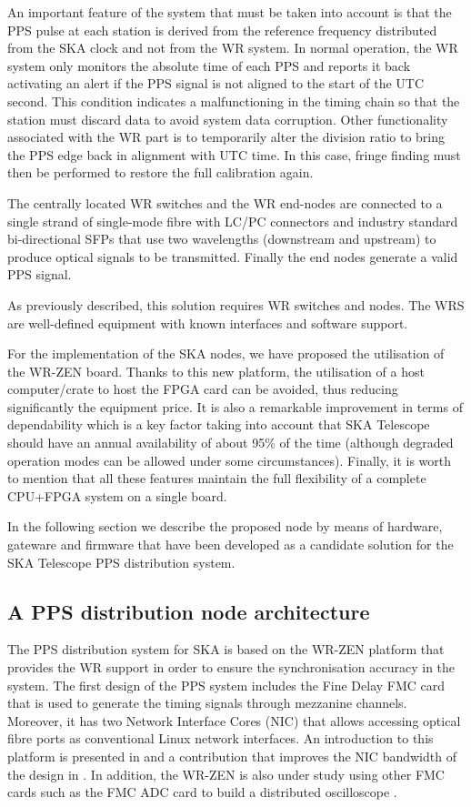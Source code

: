 An important feature of the system that must be taken into account is that the PPS pulse at each station is derived from the reference frequency distributed from the SKA clock and not from the WR system. In normal operation, the WR system only monitors the absolute time of each PPS and reports it back activating an alert if the PPS signal is not aligned to the start of the UTC second. This condition indicates a malfunctioning in the timing chain so that the station must discard data to avoid system data corruption. Other functionality associated with the WR part is to temporarily alter the division ratio to bring the PPS edge back in alignment with UTC time. In this case, fringe finding must then be performed to restore the full calibration again.

The centrally located WR switches and the WR end-nodes are connected to a
single strand of single-mode fibre with LC/PC connectors and industry standard
bi-directional SFPs that use two wavelengths (downstream and upstream) to
produce optical signals to be transmitted. Finally the end nodes generate a valid PPS
signal. 

As previously described, this solution requires WR switches and nodes. The
WRS are well-defined equipment with known interfaces and software support. 

For the implementation of the SKA nodes, we have proposed the utilisation of
the WR-ZEN board. Thanks to this new platform, the utilisation of a host
computer/crate to host the FPGA card can be avoided, thus reducing significantly
the equipment price. It is also a remarkable improvement in terms of
dependability which is a key factor taking into account that SKA Telescope
should have an annual availability of about 95\% of the time (although degraded
operation modes can be allowed under some circumstances).  Finally, it is worth to mention that all these features maintain the full flexibility of a complete
CPU+FPGA system on a single board. 

In the following section we describe the proposed node by means of hardware, gateware and firmware that have been developed as a candidate solution for the SKA Telescope PPS distribution system. 

\subsection{A PPS distribution node architecture}
\label{subsec:ska-pps-system-arch}

The PPS distribution system for SKA is based on the WR-ZEN platform that
provides the WR support in order to ensure the synchronisation accuracy in the
system. The first design of the PPS system includes the Fine Delay FMC card
that is used to generate the timing signals through mezzanine channels.
Moreover, it has two Network Interface Cores (NIC) that allows accessing
optical fibre ports as conventional Linux network interfaces. An introduction
to this platform is presented in \cite{migueljl-paper-wr-zen-intro} and a
contribution that improves the NIC bandwidth of the design in
\cite{jorgesg-paper-wr-zen-dma}. In addition, the WR-ZEN is also under study
using other FMC cards such as the FMC ADC card to build a distributed oscilloscope \cite{joselj-paper-wr-zen-adc}.

